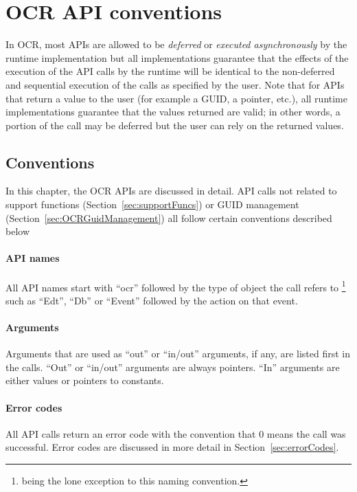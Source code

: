 \section{OCR API conventions}
In OCR, most APIs are allowed to be \emph{deferred} or \emph{executed asynchronously} by the runtime implementation
but all implementations guarantee that the effects of the execution of the API calls by the runtime will be
identical to the non-deferred and sequential execution of the calls as specified by the user. Note that for
APIs that return a value to the user (for example a GUID, a pointer, etc.), all runtime implementations guarantee
that the values returned are valid; in other words, a portion of the call may be deferred but the user can
rely on the returned values.
\subsection{Conventions}
In this chapter, the OCR APIs are discussed in detail. API calls not related to support functions
(Section~\ref{sec:supportFuncs}) or GUID management (Section~\ref{sec:OCRGuidManagement}) all
follow certain conventions described below
%
\paragraph*{API names}
All API names start with ``ocr'' followed by the type of object the call refers to
\footnote{\hyperlink{func_ocrAddDependence}{} being the lone exception to this naming
convention.} such as ``Edt'', ``Db'' or ``Event'' followed by the action on that event.
%
\paragraph*{Arguments}
Arguments that are used as ``out'' or ``in/out'' arguments, if any, are listed first in the calls. ``Out'' or
``in/out'' arguments are always pointers. ``In'' arguments are either values or pointers to constants.
%
\paragraph*{Error codes}
All API calls return an error code with the convention that 0 means the call was successful. Error codes are discussed
in more detail in Section~\ref{sec:errorCodes}.
